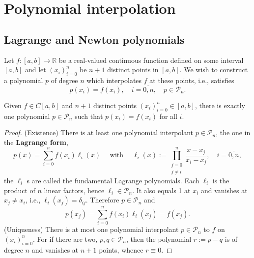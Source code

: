 \documentclass[a4paper]{article}
\begin{document}
\maketitle
\tableofcontents
\clearpage

% 

\section{Polynomial interpolation}
\subsection{Lagrange and Newton polynomials}
Let $f:[a, b] \rightarrow \mathbb{R}$ be a real-valued continuous function defined on some interval $[a, b]$ and let $(x_{i})_{i=0}^{n}$ be $n+1$ distinct points in $[a, b]$. We wish to construct a polynomial $p$ of degree $n$ which interpolates $f$ at these points, i.e., satisfies
$$
p(x_{i})=f(x_{i}), \quad i=\overline{0, n}, \quad p \in \mathcal{P}_{n} .
$$
\begin{theorem}
    Given $f \in C[a, b]$ and $n+1$ distinct points $(x_{i})_{i=0}^{n} \in[a, b]$, there is exactly one polynomial $p \in \mathcal{P}_{n}$ such that $p(x_{i})=f(x_{i})$ for all $i$.
\end{theorem}
\begin{proof}
    (Existence) There is at least one polynomial interpolant $p \in \mathcal{P}_{n}$, the one in the \textbf{Lagrange form},
    \begin{equation}\label{eqn:Lagrange 1}
        p(x)=\sum_{i=0}^{n} f(x_{i}) \ell_{i}(x) \quad \text { with } \quad \ell_{i}(x):=\prod_{\substack{j=0 \\ j \neq i}}^{n} \frac{x-x_{j}}{x_{i}-x_{j}}, \quad i=\overline{0, n},
    \end{equation}
    the $\ell_{i}$ s are called the fundamental Lagrange polynomials. Each $\ell_{i}$ is the product of $n$ linear factors, hence $\ell_{i} \in \mathcal{P}_{n}$. It also equals 1 at $x_{i}$ and vanishes at $x_{j} \neq x_{i}$, i.e., $\ell_{i}(x_{j})=\delta_{i j}$. Therefore $p \in \mathcal{P}_{n}$ and
    $$
    p(x_{j})=\sum_{i=0}^{n} f(x_{i}) \ell_{i}(x_{j})=f(x_{j}) .
    $$
    (Uniqueness) There is at most one polynomial interpolant $p \in \mathcal{P}_{n}$ to $f$ on $(x_{i})_{i=0}^{n}$. For if there are two, $p, q \in \mathcal{P}_{n}$, then the polynomial $r:=p-q$ is of degree $n$ and vanishes at $n+1$ points, whence $r \equiv 0$.
\end{proof}
\end{document}
